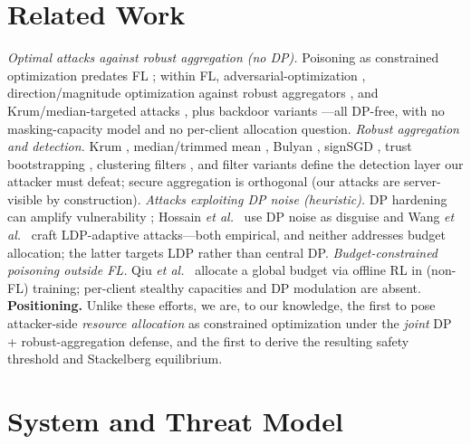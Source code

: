 \documentclass[final,1p,times]{elsarticle}
\newcommand{\etal}{\emph{et al.}}
\begin{document}
\section{Related Work}
\emph{Optimal attacks against robust aggregation (no DP).} Poisoning
as constrained optimization predates FL
\cite{biggio2012poisoning,meizhu2015teaching,biggio2018wild}; within
FL, adversarial-optimization \cite{bhagoji2019analyzing},
direction/magnitude optimization against robust aggregators
\cite{shejwalkar2021turning}, and Krum/median-targeted attacks
\cite{fang2020local,sun2019can}, plus backdoor variants
\cite{bagdasaryan2020backdoor,xie2020dba}---all DP-free, with no
masking-capacity model and no per-client allocation question.
\emph{Robust aggregation and detection.} Krum \cite{blanchard2017},
median/trimmed mean \cite{yin2018}, Bulyan \cite{mhamdi2018hidden},
signSGD \cite{bernstein2018signsgd}, trust bootstrapping
\cite{cao2021fltrust}, clustering filters \cite{nguyen2022flame}, and
filter variants \cite{xu2024minvar,xu2024agnostic,luong2024fedlsae}
define the detection layer our attacker must defeat; secure aggregation
\cite{bonawitz2017practical} is orthogonal (our attacks are
server-visible by construction). \emph{Attacks exploiting DP noise
(heuristic).} DP hardening can amplify vulnerability
\cite{song2019privacy}; Hossain \etal\ \cite{hossain2025mpelm} use DP
noise as disguise and Wang \etal\ \cite{wang2025ldpfl} craft
LDP-adaptive attacks---both empirical, and neither addresses budget
allocation; the latter targets LDP rather than central DP.
\emph{Budget-constrained poisoning outside FL.} Qiu \etal\
\cite{qiu2025budget} allocate a global budget via offline RL in
(non-FL) training; per-client stealthy capacities and DP modulation
are absent. \textbf{Positioning.} Unlike these efforts, we are, to our
knowledge, the first to pose
attacker-side \emph{resource allocation} as constrained optimization
under the \emph{joint} DP + robust-aggregation defense, and the first
to derive the resulting safety threshold and Stackelberg
equilibrium.

\section{System and Threat Model}
\end{document}
